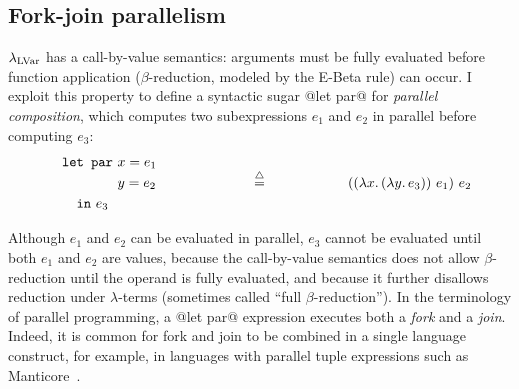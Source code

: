 \subsection{Fork-join parallelism}\label{subsection:fork-join}

$\lambda_{\textrm{LVar}}$ has a call-by-value semantics: arguments must be fully
evaluated before function application ($\beta$-reduction, modeled by
the {\sc E-Beta} rule) can occur.  I exploit this property to define a
syntactic sugar @let par@ for \emph{parallel composition}, which
computes two subexpressions $e_1$ and $e_2$ in parallel before
computing $e_3$:
\begin{displaymath}
\begin{minipage}[b]{2in}
  \begin{equation*}
\begin{split}
& \LETPAR ~x = e_1 \\ 
& \letparspace ~y = e_2 \\
& \letspace \IN~e_3 
\end{split}
\end{equation*}
\end{minipage}
\begin{minipage}[b]{1in}
\centering
$\defeq$
\end{minipage}
\begin{minipage}[b]{2in}
\begin{equation*}
  \app{(\app{(\lam{x}{(\lam{y}{e_3})})}{e_1})}{e_2}
\end{equation*}
\end{minipage}
\end{displaymath}

Although $e_1$ and $e_2$ can be evaluated in parallel, $e_3$ cannot be
evaluated until both $e_1$ and $e_2$ are values, because the
call-by-value semantics does not allow $\beta$-reduction until the
operand is fully evaluated, and because it further disallows reduction
under $\lambda$-terms (sometimes called ``full $\beta$-reduction'').
In the terminology of parallel programming, a @let par@ expression
executes both a \emph{fork} and a \emph{join}.  Indeed, it is common
for fork and join to be combined in a single language construct, for
example, in languages with parallel tuple expressions such as
Manticore~\cite{manticore_parallel_tuples}.


